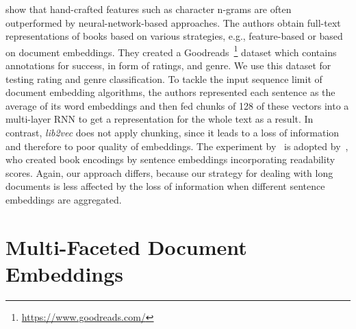 \documentclass[11pt]{article}
\begin{document}
\citet{maharjan_multi-task_2017} show that hand-crafted features such as character n-grams are often outperformed by neural-network-based approaches.
The authors obtain full-text representations of books based on various strategies, e.g., feature-based or based on document embeddings. %
They created a Goodreads~\footnote{\url{https://www.goodreads.com/}} dataset which contains annotations for success, in form of ratings, and genre. 
We use this dataset for testing rating and genre classification.
To tackle the input sequence limit of document embedding algorithms, the authors represented each sentence as the average of its word embeddings and then fed chunks of 128 of these vectors into a multi-layer RNN to get a representation for the whole text as a result.
In contrast, \emph{lib2vec} does not apply chunking, since it leads to a loss of information and therefore to poor quality of embeddings. %
The experiment by~\citet{maharjan_multi-task_2017} is adopted by~\citet{khalifa_will_2020}, who created book encodings by sentence embeddings incorporating readability scores.
Again, our approach differs, because our strategy for dealing with long documents is less affected by the loss of information when different sentence embeddings are aggregated.


\section{Multi-Faceted Document Embeddings}
\end{document}
